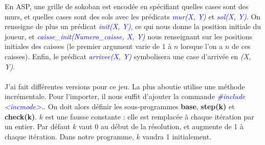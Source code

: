 \documentclass[10pt,a4paper]{article}
\begin{document}
En ASP, une grille de sokoban est encodée en spécifiant quelles cases sont des murs, et quelles cases sont des sols avec les prédicats \emph{\textcolor{blue}{mur(X, Y)}} et \emph{\textcolor{blue}{sol(X, Y)}}. On renseigne de plus un 
prédicat \emph{\textcolor{blue}{init(X, Y)}}, ce qui nous donne la position initiale du joueur, et \emph{\textcolor{blue}{caisse\_init(Numero\_caisse, X, Y)}} nous renseignant sur les positions initiales des caisses (le premier 
argument varie de 1 à $n$ lorsque l'on a $n$ de ces caisses). Enfin, le prédicat \emph{\textcolor{blue}{arrivee(X, Y)}} symbolisera une case d'arrivée en \emph{(X, Y)}.\\ \\
J'ai fait différentes versions pour ce jeu. La plus aboutie utilise une méthode incrémentale. Pour l'importer, il nous suffit d'ajouter la commande \emph{\textcolor{blue}{\#include \textless incmode\textgreater.}}. On doit alors 
définir les sous-programmes \textbf{base}, \textbf{step(k)} et \textbf{check(k)}. $k$ est une fausse constante : elle est remplacée à chaque itération par un entier. Par défaut $k$ vaut 0 au début de la résolution, et augmente de 1 
à chaque itération. Dans notre programme, $k$ vaudra 1 initialement.\\
\end{document}
